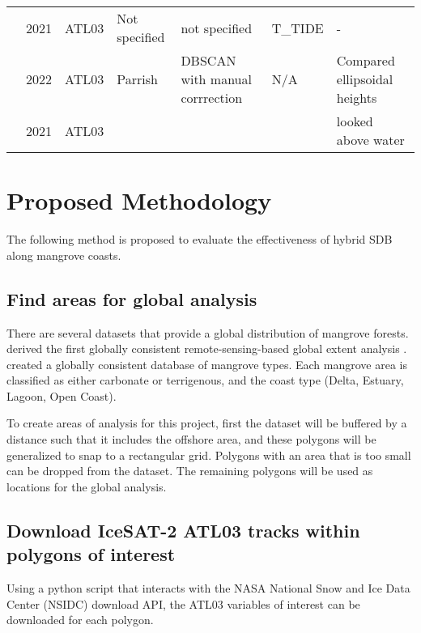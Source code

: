\begin{landscape}
\begin{table}
\begin{tabular}{lllp{3cm}p{3cm}ll}
                  \citeauthor{Lee2021}                           & 2021 & ATL03   & Not specified                 & not specified                  & T\_TIDE         & -                            \\
                  \citeauthor{LeQuilleuc2022b}            & 2022 & ATL03   & Parrish                       & DBSCAN with manual corrrection & N/A             & Compared ellipsoidal heights \\
                  \citeauthor{Xu2022a}                            & 2021 & ATL03   &                               &                                &                 & looked above water           \\
                  \bottomrule
            \end{tabular}
      \end{table}
\end{landscape}

\chapter{Proposed Methodology}
The following method is proposed to evaluate the effectiveness of hybrid SDB along mangrove coasts.

\section{Find areas for global analysis}
There are several datasets that provide a global distribution of mangrove forests. \citeauthor{Giri2011b} derived the first globally consistent remote-sensing-based global extent analysis \cite{Worthington2020}. \citeauthor{add} created a globally consistent database of mangrove types. Each mangrove area is classified as either carbonate or terrigenous, and the coast type (Delta, Estuary, Lagoon, Open Coast).

To create areas of analysis for this project, first the \citeauthor{Giri2011b} dataset will be buffered by a distance such that it includes the offshore area, and these polygons will be generalized to snap to a rectangular grid. Polygons with an area that is too small can be dropped from the dataset. The remaining polygons will be used as locations for the global analysis.

\section{Download IceSAT-2 ATL03 tracks within polygons of interest}
Using a python script that interacts with the NASA National Snow and Ice Data Center (NSIDC) download API, the ATL03 variables of interest can be downloaded for each polygon. 

